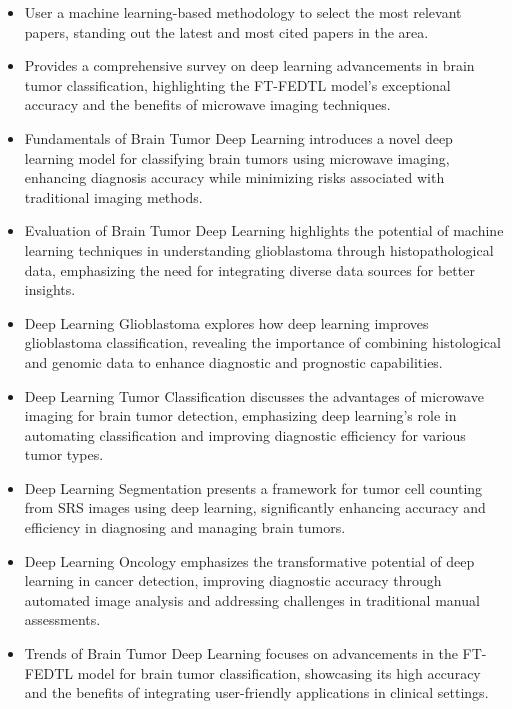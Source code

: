 \documentclass[runningheads]{llncs}
\begin{document}
\begin{itemize}[label=\textbullet]
    \item User a machine learning-based methodology to select the most relevant papers, standing out the latest and most cited papers in the area.
    \item Provides a comprehensive survey on deep learning advancements in brain tumor classification, highlighting the FT-FEDTL model's exceptional accuracy and the benefits of microwave imaging techniques.
    \item Fundamentals of Brain Tumor Deep Learning introduces a novel deep learning model for classifying brain tumors using microwave imaging, enhancing diagnosis accuracy while minimizing risks associated with traditional imaging methods.
    \item Evaluation of Brain Tumor Deep Learning highlights the potential of machine learning techniques in understanding glioblastoma through histopathological data, emphasizing the need for integrating diverse data sources for better insights.
    \item Deep Learning Glioblastoma explores how deep learning improves glioblastoma classification, revealing the importance of combining histological and genomic data to enhance diagnostic and prognostic capabilities.
    \item Deep Learning Tumor Classification discusses the advantages of microwave imaging for brain tumor detection, emphasizing deep learning's role in automating classification and improving diagnostic efficiency for various tumor types.
    \item Deep Learning Segmentation presents a framework for tumor cell counting from SRS images using deep learning, significantly enhancing accuracy and efficiency in diagnosing and managing brain tumors.
    \item Deep Learning Oncology emphasizes the transformative potential of deep learning in cancer detection, improving diagnostic accuracy through automated image analysis and addressing challenges in traditional manual assessments.
    \item Trends of Brain Tumor Deep Learning focuses on advancements in the FT-FEDTL model for brain tumor classification, showcasing its high accuracy and the benefits of integrating user-friendly applications in clinical settings.
\end{itemize}
\end{document}
